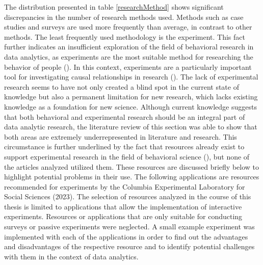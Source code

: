 The distribution presented in table \ref{researchMethod} shows significant discrepancies in the number of research methods used. Methods such as case studies and surveys are used more frequently than average, in contrast to other methods. The least frequently used methodology is the experiment. This fact further indicates an insufficient exploration of the field of behavioral research in data analytics, as experiments are the most suitable method for researching the behavior of people (\cite{Gniewosz.2011}). In this context, experiments are a particularly important tool for investigating causal relationships in research (\cite{Gniewosz.2011}). The lack of experimental research seems to have not only created a blind spot in the current state of knowledge but also a permanent limitation for new research, which lacks existing knowledge as a foundation for new science. Although current knowledge suggests that both behavioral and experimental research should be an integral part of data analytic research, the literature review of this section was able to show that both areas are extremely underrepresented in literature and research. This circumstance is further underlined by the fact that resources already exist to support experimental research in the field of behavioral science (\cite{Columbia.2023}), but none of the articles analyzed utilized them. These resources are discussed briefly below to highlight potential problems in their use. The following applications are resources recommended for experiments by the Columbia Experimental Laboratory for Social Sciences (2023). The selection of resources analyzed in the course of this thesis is limited to applications that allow the implementation of interactive experiments. Resources or applications that are only suitable for conducting surveys or passive experiments were neglected. A small example experiment was implemented with each of the applications in order to find out the advantages and disadvantages of the respective resource and to identify potential challenges with them in the context of data analytics.



